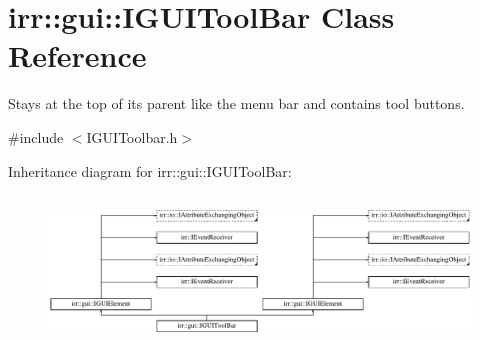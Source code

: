 \hypertarget{classirr_1_1gui_1_1IGUIToolBar}{}\section{irr\+:\+:gui\+:\+:I\+G\+U\+I\+Tool\+Bar Class Reference}
\label{classirr_1_1gui_1_1IGUIToolBar}


Stays at the top of its parent like the menu bar and contains tool buttons.  




{\ttfamily \#include $<$I\+G\+U\+I\+Toolbar.\+h$>$}

Inheritance diagram for irr\+:\+:gui\+:\+:I\+G\+U\+I\+Tool\+Bar\+:\begin{figure}[H]
\begin{center}
\leavevmode
\includegraphics[height=4.038462cm]{classirr_1_1gui_1_1IGUIToolBar}
\end{center}
\end{figure}

